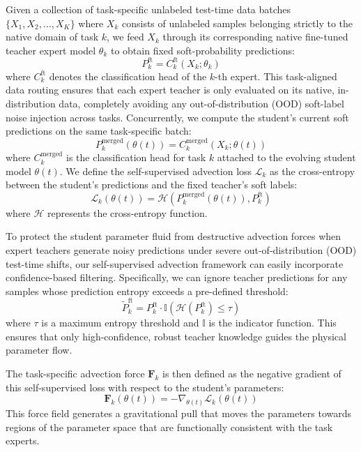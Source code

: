 Given a collection of task-specific unlabeled test-time data batches $\{X_1, X_2, \dots, X_K\}$ where $X_k$ consists of unlabeled samples belonging strictly to the native domain of task $k$, we feed $X_k$ through its corresponding native fine-tuned teacher expert model $\theta_k$ to obtain fixed soft-probability predictions:
\begin{equation}
    P_k^{\text{ft}} = C_k^{\text{ft}}(X_k; \theta_k)
\end{equation}
where $C_k^{\text{ft}}$ denotes the classification head of the $k$-th expert. This task-aligned data routing ensures that each expert teacher is only evaluated on its native, in-distribution data, completely avoiding any out-of-distribution (OOD) soft-label noise injection across tasks. Concurrently, we compute the student's current soft predictions on the same task-specific batch:
\begin{equation}
    P_k^{\text{merged}}(\theta(t)) = C_k^{\text{merged}}(X_k; \theta(t))
\end{equation}
where $C_k^{\text{merged}}$ is the classification head for task $k$ attached to the evolving student model $\theta(t)$. We define the self-supervised advection loss $\mathcal{L}_k$ as the cross-entropy between the student's predictions and the fixed teacher's soft labels:
\begin{equation}
    \mathcal{L}_k(\theta(t)) = \mathcal{H}\left(P_k^{\text{merged}}(\theta(t)), P_k^{\text{ft}}\right)
\end{equation}
where $\mathcal{H}$ represents the cross-entropy function. 

To protect the student parameter fluid from destructive advection forces when expert teachers generate noisy predictions under severe out-of-distribution (OOD) test-time shifts, our self-supervised advection framework can easily incorporate confidence-based filtering. Specifically, we can ignore teacher predictions for any samples whose prediction entropy exceeds a pre-defined threshold:
\begin{equation}
    \tilde{P}_k^{\text{ft}} = P_k^{\text{ft}} \cdot \mathbb{I}\left(\mathcal{H}\left(P_k^{\text{ft}}\right) \le \tau\right)
\end{equation}
where $\tau$ is a maximum entropy threshold and $\mathbb{I}$ is the indicator function. This ensures that only high-confidence, robust teacher knowledge guides the physical parameter flow.

The task-specific advection force $\mathbf{F}_k$ is then defined as the negative gradient of this self-supervised loss with respect to the student's parameters:
\begin{equation}
    \mathbf{F}_k(\theta(t)) = -\nabla_{\theta(t)} \mathcal{L}_k(\theta(t))
\end{equation}
This force field generates a gravitational pull that moves the parameters towards regions of the parameter space that are functionally consistent with the task experts.

